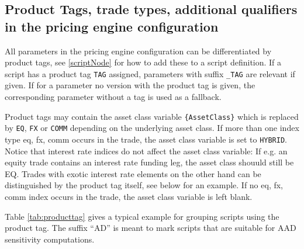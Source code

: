 \subsection{Product Tags, trade types, additional qualifiers in the pricing engine configuration}\label{producttags_engineconfig}

All parameters in the pricing engine configuration can be differentiated by product tags, see \ref{scriptNode} for how
to add these to a script definition. If a script has a product tag \verb+TAG+ assigned, parameters with suffix
\verb+_TAG+ are relevant if given. If for a parameter no version with the product tag is given, the corresponding
parameter without a tag is used as a fallback.

Product tags may contain the asset class variable \verb+{AssetClass}+ which is replaced by \verb+EQ+, \verb+FX+ or
\verb+COMM+ depending on the underlying asset class. If more than one index type eq, fx, comm occurs in the trade, the
asset class variable is set to \verb+HYBRID+. Notice that interest rate indices do not affect the asset class variable:
If e.g. an equity trade contains an interest rate funding leg, the asset class shouuld still be EQ. Trades with exotic
interest rate elements on the other hand can be distinguished by the product tag itself, see below for an example. If no
eq, fx, comm index occurs in the trade, the asset class variable is left blank.

Table \ref{tab:producttag} gives a typical example for grouping scripts using the product tag. The suffix ``AD'' is
meant to mark scripts that are suitable for AAD sensitivity computations.

